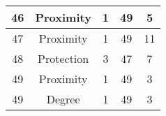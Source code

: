 \documentclass[results.tex]{subfiles}
\begin{document}
\begin{center}
\begin{tabular}{| c || c | c | c | c |}
            \hline
            46                      & Proximity                    & 1                      & 49                      & 5                    \\
            \hline
            47                      & Proximity                    & 1                      & 49                      & 11                   \\
            \hline
            48                      & Protection                   & 3                      & 47                      & 7                    \\
            \hline
            49                      & Proximity                    & 1                      & 49                      & 3                    \\
            \hline
            49                      & Degree                       & 1                      & 49                      & 3                    \\
            \hline
        \end{tabular}
    \end{center}
\end{document}
